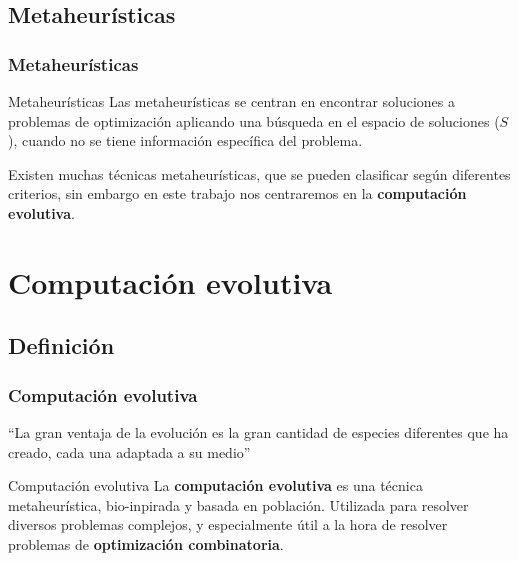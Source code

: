 \documentclass{beamer}
\begin{document}
\subsection{Metaheurísticas}

\begin{frame}
\frametitle{Metaheurísticas}

\begin{block}{Metaheurísticas}
 Las metaheurísticas se centran en encontrar soluciones a problemas de optimización aplicando una búsqueda en el espacio de soluciones ($S$), cuando no se tiene información específica del problema.
\end{block}

\bigskip

Existen muchas técnicas metaheurísticas, que se pueden clasificar según diferentes criterios, sin embargo en este trabajo nos centraremos en la \textbf{computación evolutiva}.

\end{frame}

\section{Computación evolutiva}


\subsection{Definición}

\begin{frame}
\frametitle{Computación evolutiva}

\begin{exampleblock}{}
  {\large ``La gran ventaja de la evolución es la gran cantidad de especies diferentes que ha creado, cada una adaptada a su medio''}
  \vskip5mm
  \hspace*{}
\end{exampleblock}

\begin{block}{Computación evolutiva}
 La \textbf{computación evolutiva} es una técnica metaheurística, bio-inpirada y basada en población. Utilizada para resolver diversos problemas complejos, y especialmente útil a la hora de resolver problemas de \textbf{optimización combinatoria}.
\end{block}

\end{frame}
\end{document}
